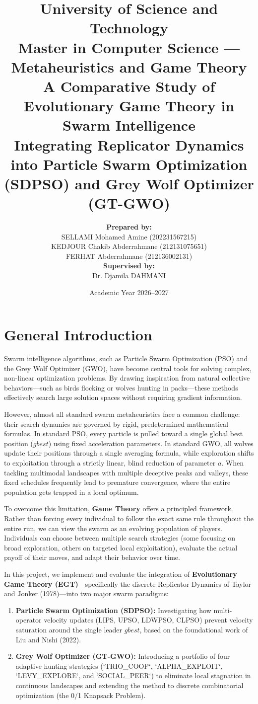 \documentclass[12pt,a4paper]{article}
\title{
    \vspace{-1.5cm}
    \textbf{University of Science and Technology} \\
    \large Master in Computer Science --- Metaheuristics and Game Theory \\[1.2cm]
    \LARGE \textbf{A Comparative Study of Evolutionary Game Theory in Swarm Intelligence} \\[0.4cm]
    \Large \textbf{Integrating Replicator Dynamics into Particle Swarm Optimization (SDPSO) and Grey Wolf Optimizer (GT-GWO)} \\[1.2cm]
}
\author{
    \textbf{Prepared by:} \\[0.2cm]
    SELLAMI Mohamed Amine (202231567215) \\
    KEDJOUR Chakib Abderrahmane (212131075651) \\
    FERHAT Abderrahmane (212136002131) \\[0.6cm]
    \textbf{Supervised by:} \\[0.2cm]
    Dr. Djamila DAHMANI
}
\date{\vfill Academic Year 2026--2027}
\begin{document}
\maketitle
\thispagestyle{empty}
\newpage

\tableofcontents
\newpage

\section*{General Introduction}

Swarm intelligence algorithms, such as Particle Swarm Optimization (PSO) and the Grey Wolf Optimizer (GWO), have become central tools for solving complex, non-linear optimization problems. By drawing inspiration from natural collective behaviors---such as birds flocking or wolves hunting in packs---these methods effectively search large solution spaces without requiring gradient information.

However, almost all standard swarm metaheuristics face a common challenge: their search dynamics are governed by rigid, predetermined mathematical formulas. In standard PSO, every particle is pulled toward a single global best position ($gbest$) using fixed acceleration parameters. In standard GWO, all wolves update their positions through a single averaging formula, while exploration shifts to exploitation through a strictly linear, blind reduction of parameter $a$. When tackling multimodal landscapes with multiple deceptive peaks and valleys, these fixed schedules frequently lead to premature convergence, where the entire population gets trapped in a local optimum.

To overcome this limitation, \textbf{Game Theory} offers a principled framework. Rather than forcing every individual to follow the exact same rule throughout the entire run, we can view the swarm as an evolving population of players. Individuals can choose between multiple search strategies (some focusing on broad exploration, others on targeted local exploitation), evaluate the actual payoff of their moves, and adapt their behavior over time.

In this project, we implement and evaluate the integration of \textbf{Evolutionary Game Theory (EGT)}---specifically the discrete Replicator Dynamics of Taylor and Jonker (1978)---into two major swarm paradigms:
\begin{enumerate}
    \item \textbf{Particle Swarm Optimization (SDPSO):} Investigating how multi-operator velocity updates (LIPS, UPSO, LDWPSO, CLPSO) prevent velocity saturation around the single leader $gbest$, based on the foundational work of Liu and Nishi (2022).
    \item \textbf{Grey Wolf Optimizer (GT-GWO):} Introducing a portfolio of four adaptive hunting strategies (`TRIO\_COOP`, `ALPHA\_EXPLOIT`, `LEVY\_EXPLORE`, and `SOCIAL\_PEER`) to eliminate local stagnation in continuous landscapes and extending the method to discrete combinatorial optimization (the 0/1 Knapsack Problem).
\end{enumerate}
\end{document}
